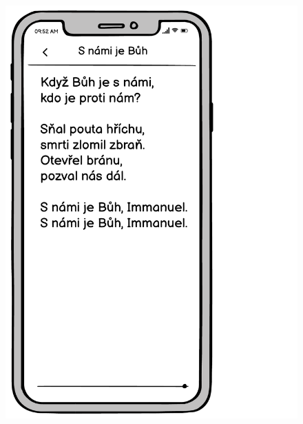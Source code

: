 \begin{figure}
    \includegraphics[width=\textwidth/3 - 2pt]{images/3-navrh/3-6-detail-pisne-host.pdf}

\end{figure}

